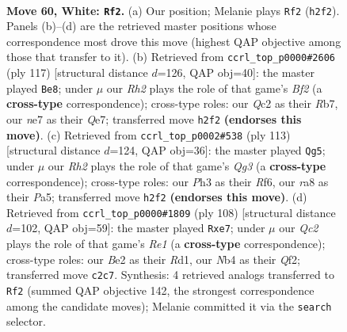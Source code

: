 \documentclass[11pt]{article}
\begin{document}
\clearpage

\begin{figure}[p]\centering
\begin{subfigure}{0.46\textwidth}\centering
\resizebox{\linewidth}{!}{%
\newchessgame
\chessboard[
  setfen={rn1qk2r/4n1b1/6p1/3p2P1/1N1P1P1p/1R5P/1BQ1B2R/7K w - - 9 60},
  showmover=false,
  pgfstyle=straightmove, color=movearrow, markmove={h2-f2}
]}
\caption{}
\end{subfigure}\hfill
\begin{subfigure}{0.46\textwidth}\centering
\resizebox{\linewidth}{!}{%
\newchessgame
\chessboard[
  setfen={6k1/1r2qbn1/4p2r/3pP3/3N4/1P1B2QP/2N3R1/1K6 b - - 22 59},
  showmover=false,
  pgfstyle=straightmove, color=movearrow, markmove={f7-e8}
]}
\caption{}
\end{subfigure}
\\[4pt]
\begin{subfigure}{0.46\textwidth}\centering
\resizebox{\linewidth}{!}{%
\newchessgame
\chessboard[
  setfen={8/7k/4prqp/p2p4/3Pnb2/P2N3R/1B3PP1/3Q2K1 b - - 14 57},
  showmover=false,
  pgfstyle=straightmove, color=movearrow, markmove={g6-g5}
]}
\caption{}
\end{subfigure}\hfill
\begin{subfigure}{0.46\textwidth}\centering
\resizebox{\linewidth}{!}{%
\newchessgame
\chessboard[
  setfen={3q3k/1p1br1nr/3N1p2/2P2p2/p2P3P/P7/5Q1B/3RR1K1 w - - 2 55},
  showmover=false,
  pgfstyle=straightmove, color=movearrow, markmove={e1-e7}
]}
\caption{}
\end{subfigure}
\caption{\textbf{Move 60, White: \texttt{Rf2}.} (a) Our position; Melanie plays \texttt{Rf2} (\texttt{h2f2}). Panels (b)--(d) are the retrieved master positions whose correspondence most drove this move (highest QAP objective among those that transfer to it). (b) Retrieved from \texttt{ccrl\_top\_p0000\#2606} (ply 117) [structural distance $d$=126, QAP obj=40]: the master played \texttt{Be8}; under $\mu$ our \emph{Rh2} plays the role of that game's \emph{Bf2} (a \textbf{cross-type} correspondence); cross-type roles: our \emph{Q}c2 as their \emph{R}b7, our \emph{n}e7 as their \emph{Q}e7; transferred move \texttt{h2f2} \textbf{(endorses this move)}. (c) Retrieved from \texttt{ccrl\_top\_p0002\#538} (ply 113) [structural distance $d$=124, QAP obj=36]: the master played \texttt{Qg5}; under $\mu$ our \emph{Rh2} plays the role of that game's \emph{Qg3} (a \textbf{cross-type} correspondence); cross-type roles: our \emph{P}h3 as their \emph{R}f6, our \emph{r}a8 as their \emph{P}a5; transferred move \texttt{h2f2} \textbf{(endorses this move)}. (d) Retrieved from \texttt{ccrl\_top\_p0000\#1809} (ply 108) [structural distance $d$=102, QAP obj=59]: the master played \texttt{Rxe7}; under $\mu$ our \emph{Qc2} plays the role of that game's \emph{Re1} (a \textbf{cross-type} correspondence); cross-type roles: our \emph{B}e2 as their \emph{R}d1, our \emph{N}b4 as their \emph{Q}f2; transferred move \texttt{c2c7}. Synthesis: 4 retrieved analogs transferred to \texttt{Rf2} (summed QAP objective 142, the strongest correspondence among the candidate moves); Melanie committed it via the \texttt{search} selector.}
\label{fig:thought-m118}
\end{figure}
\end{document}
